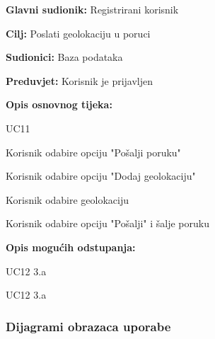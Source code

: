 \noindent {}
\begin{packed_item}
	
	\item \textbf{Glavni sudionik: }Registrirani korisnik
	\item  \textbf{Cilj:} Poslati geolokaciju u poruci
	\item  \textbf{Sudionici:} Baza podataka
	\item  \textbf{Preduvjet:} Korisnik je prijavljen
	\item  \textbf{Opis osnovnog tijeka:}
	
	\item[] \begin{packed_enum}
		
		\item UC11
		\item Korisnik odabire opciju "Pošalji poruku"
		\item Korisnik odabire opciju "Dodaj geolokaciju"
		\item Korisnik odabire geolokaciju
		\item Korisnik odabire opciju "Pošalji" i šalje poruku
		
	\end{packed_enum}
	
	\item  \textbf{Opis mogućih odstupanja:}
	
	\item[] \begin{packed_item}
		
		\item[4.a] UC12 3.a
		\item[5.a] UC12 3.a
		
		
	\end{packed_item}
\end{packed_item}

\subsubsection{Dijagrami obrazaca uporabe}


